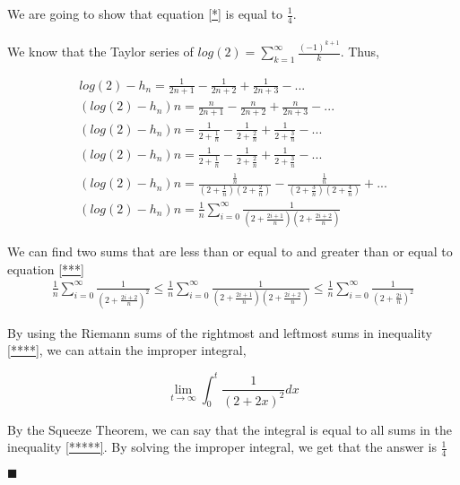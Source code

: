 \documentclass[12pt]{article}
\renewcommand{\qed}{\hfill$\blacksquare$}
\renewenvironment{proof}{\begin{addmargin}[1em]{0em}\begin{newproof}}{\end{newproof}\end{addmargin}\qed}
\begin{document}
\begin{proof}{We are going to show that equation \eqref{*} is equal to ${\frac{1}{4}}$.}
\\
\text{ }
\\
We know that the Taylor series of $log(2)=\sum_{k=1}^{\infty}\frac{(-1)^{k+1}}{k}$. Thus, 

\begin{gather}
log(2)-h_n = \frac{1}{2n+1} - \frac{1}{2n+2} + \frac{1}{2n+3} - ... \\
(log(2)-h_n)n = \frac{n}{2n+1} - \frac{n}{2n+2} + \frac{n}{2n+3} - ... \\
(log(2)-h_n)n = \frac{1}{2+\frac{1}{n}} - \frac{1}{2+\frac{2}{n}} + \frac{1}{2+\frac{3}{n}} - ... \\
(log(2)-h_n)n = \frac{1}{2+\frac{1}{n}} - \frac{1}{2+\frac{2}{n}} + \frac{1}{2+\frac{3}{n}} - ... \\
(log(2)-h_n)n = \frac{\frac{1}{n}}{(2+\frac{1}{n})(2+\frac{2}{n})} - \frac{\frac{1}{n}}{(2+\frac{3}{n})(2+\frac{4}{n})} + ... \\
(log(2)-h_n)n = \frac{1}{n}\sum_{i=0}^{\infty}{\frac{1}{(2+\frac{2i+1}{n})(2+\frac{2i+2}{n})}}
\label{***}
\end{gather}


We can find two sums that are less than or equal to and greater than or equal to equation \eqref{***}
\begin{gather}
\frac{1}{n}\sum_{i=0}^{\infty}{\frac{1}{(2+\frac{2i+2}{n})^2}} \leq \frac{1}{n}\sum_{i=0}^{\infty}{\frac{1}{(2+\frac{2i+1}{n})(2+\frac{2i+2}{n})}} \leq \frac{1}{n}\sum_{i=0}^{\infty}{\frac{1}{(2+\frac{2i}{n})^2}}\label{****}
\end{gather}

By using the Riemann sums of the rightmost and leftmost sums in inequality \eqref{****}, we can attain the improper integral,

\begin{equation}\label{*****}
\lim_{t\to\infty}\int_0^t\frac{1}{(2+2x)^2}dx 
\end{equation}

By the Squeeze Theorem, we can say that the integral is equal to all sums in the inequality \eqref{*****}. By solving the improper integral, we get that the answer is $\frac{1}{4}$

\end{proof}
\end{document}

